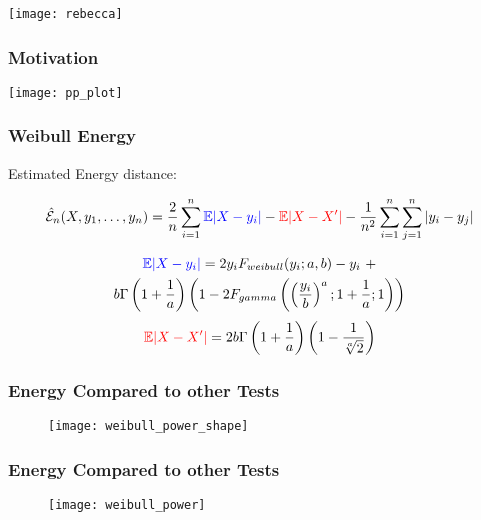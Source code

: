 \documentclass[presentation]{beamer}
\newenvironment{Figure}
{\par\medskip\noindent\minipage{\linewidth}}
{\endminipage\par\medskip}
\begin{document}
\begin{frame}
  \texttt{[image: rebecca]}
\end{frame}

\begin{frame}
  \frametitle{Motivation}
  \begin{Figure}
    \centering
    \texttt{[image: pp\_plot]}
  \end{Figure}
\end{frame}

\begin{frame}
  \frametitle{Weibull Energy}
  \begin{block}{Estimated Energy distance:}
    \begin{center}
      $$\hat{\mathcal{E}}_n(X, y_1, \ldots, y_n) = \frac{2}{n} \sum_{i=1}^n \textcolor{blue}{\mathbb{E}|X - y_i|}  - \textcolor{red}{\mathbb{E}|X - X'|}  - \frac{1}{n^2} \sum_{i=1}^n \sum_{j=1}^n |y_i - y_j|$$
    \end{center}
  \end{block}  
  \begin{gather*}
    \textcolor{blue}{\mathbb{E}|X-y_i|} = 2y_i F_{weibull}(y_i;a,b)
    -y_i \,\, + \\ b\Gamma\left(1 + \frac{1}{a}\right)  \left( 1 -2
      F_{gamma}\left( \left( \frac{y_i}{b} \right)^a; 1 + \frac{1}{a};
        1\right) \right) 
  \end{gather*}
  \vskip 0.3in
  \begin{displaymath}
    \textcolor{red}{\mathbb{E}|X - X'|} = 2b\Gamma \left( 1 + \frac{1}{a} \right)
    \left( 1 - \frac{1}{\sqrt[a]{2}} \right)
  \end{displaymath}
\end{frame}

\begin{frame}
  \frametitle{Energy Compared to other Tests}
  \begin{figure}
    \centering
    \texttt{[image: weibull\_power\_shape]}
  \end{figure}
\end{frame}

\begin{frame}
  \frametitle{Energy Compared to other Tests}
  \begin{figure}
    \centering
    \texttt{[image: weibull\_power]}
  \end{figure}
\end{frame}
\end{document}
